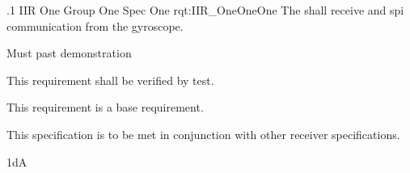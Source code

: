 \ONERQMTV
{\RqtNumberBase.1}
{IIR One Group One Spec One}
{rqt:IIR_OneOneOne}
{The \ThisSys{} shall receive and spi communication from the gyroscope.}
{
	\item [Phase 1] Must past demonstration
}
{This requirement shall be verified by test.}
{
	\item [N/A] This requirement is a base requirement.
}
{
	\item This specification is to be met in conjunction with other receiver specifications.
}
{1dA}
